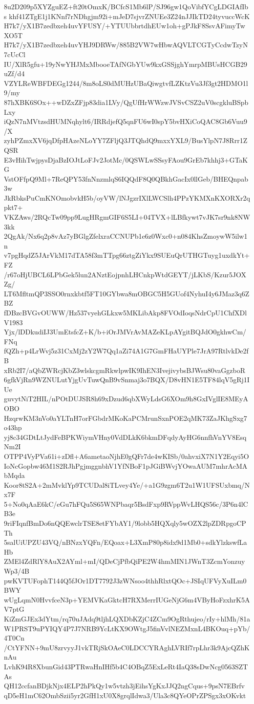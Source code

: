 8u2D209p5XYZguEZ+ft20tOmxK/BCfcS1Mb6lP/SJ96gw1QoVibfYCgLDGIAfIbs
khf41ZTgE1j1KNnf7rNDhgjm92i+mJeD7sjvrZNUEe3Z24nJJIkTD24tyvuccWcK
H7k7/yX1B7zedbxeh4uvYFUSY/+YTUUbbrtdhEUw1oh+gPJkF8SsvAFimyTwXO5T
H7k7/yX1B7zedbxeh4uvYHJ9DRWw/885B2VW7wHbwAQVLTCGTyCcdwTzyN7cUcCl
IU/XlR5gfu+19yNwYHJMxMbooeTAfNGbYUw9kxGSSjghYmrpMBUsHCGB29uZf/d4
VZYLReWBFDEGg1244/8m8oLS0dMUHzUBaQiwgtvfLZKtzVu3Jf3gt2HDMO1l9/my
87hXBK6SOx++wDZxZFjp83dia1LVy/QgUfHrWWzwJVSvCSZ2uV0scgkluBSpbLxy
iQzN7nMVtzsdHUMNqhylt6/IRRdjefQ5qnFU6wI0spY5bvHXiCoQAC8Gb6Vuu9/X
zyhPZmxXV6jqDfpHAzeNLoYY7ZFljQ3JTQhdQ9mxxYXL9/BusYlpN7J8Rrr1ZQSR
E3vHihTwjpysDjaBzIOJtLoFJv2JotMc/0QSWLwSSsyFAou9GrEb7khhj3+GTaKG
VstOFfpQ9Ml+7ReQPY53fnNnzmlqS6IQQdF8Q0QBkhGacIx0llGeb/BHEQnpab3w
JkRbksPuCmKNOmobvkH5b/oyVW/lNJgzrIXlLWCSlh4PPzYKMXnKXORXr2qpkt7+
VKZAws/2RQcTw09pp9LugHRgmGIF6S5LI+04TVX+lLBfkywt7vJK7sr9nk8NW3kk
2QgAk/Nx6q2p8vAz7yBGlgZfelxraCCNUPb1e6z0Wxc0+n084KhsZmoywW5ilw1n
v7pgHqdZ5JArVkM17dTA58f3mTTpg66ztgZiYkx9SUEuQrUTHGTuyg1uxdkYt+FZ
/r67oHjUBCL6LPbGek5lun2ANztEojpnhLHCnkpWtdGEYT/jLKbS/Kzur5JOXZg/
LT6MfltmQP3SSO0rnxkbtf5FT10GYbwa8mOBGC5H5GUof4NyhuI4y6JMaz3q6ZBZ
fDBzcBVGvOUWW/Hz537vyehGLkxw5MKLibAkp8FVOdIoqsNdrCpU1ChfXDlV1983
Yjx/lDDkudiIJ3UmEtsfcZ+K/b+iOrJMVrAvMAZeKLpAYgitBQJdO0gkhwCm/FNq
fQZh+p4LrWvj5z31CxMj2zY2W7Qq1aZi74A1G7GmFHaUYPle7JrA97RtlvkDe2fB
xRb2I7/aQbZWRcjKbZ3wlskcgmRkwlpwIK9IhEN3IvejivybsBJWsu80vaGgzboR
6gfkVjRn9WZNULutYjgUvTuwQnB9vSnmaj3o7BQX/D8vHN1E5TF84lqV5gRj1IUe
guvytNiT2HIL/nPOtDUJSR8h69xDzud6qbXWyLdsG6XOm9h8GxIVglIE8MEyAOBO
HzqrwKM3nVo0aYLTnH7orFGbdrMKoKaPCMrunSxnPOE2qMK73ZaJKhgSxg7o43hp
yj8c34GDtLtJydFeBPKWiymVHny0VdDLkK6bkmDFqdyAyHG6nnfhVnYV8EsqNm2I
OTPP4VyPVa61i+zDfl+A6ametaoNjhE0gQFr7de4wKISb/0ahvxiX7N1Y2Eqyi5O
IoNcGopbw46M1S2RJhPgjmggnbhV1YfNBoF1pJGiBWvjYOwaAUM7mhrAcMAbMqda
Koor8tS2A+2mMvklYp9TCUDal8iTLvey4Ye/+a1G9zgm6T2u1W1UFSUxbmq/Nx7F
5+No0qAaE6kC/eGu7hFQu5S65WNPbaqr5BsdFxp9RVppWvLHQS56c/3P6n4lCB3e
9riFIqnfBmDo6nQQEwclrTSE8etFYbAY1/9lobb5HQXqly5wOZX2lpZDRpgoCPTh
5salUiUPZU43VQ/nBNzxYQFn/EQoax+L3XmP80p8idx9d1Mb0+sdkYlzkswfLaHb
ZMEl4ZdRlY8AuX2AYml+mI/QDeCjPfbQiPE2W4hmMIN1JWnT3ZcmYonzuyWp3/4B
pwKVTUFophT144Q5fJOr1DT7792J3zWNsoo4thhRlxtQOc+JSIqUFVyXuILm0BWY
wUgLqmN0HvvfceN3p+YEMVKaGktcH7RXMerrIUGeNjG6m4VByHoFzxhrK5AV7ptG
KiZmGJEx3dYtm/rq70uJAdq9tljhLQXDbKZjC4ZCm9OgRthujeo/rIy+hlMh/81a
W1PRST9uPYIQY4P7J7NRB9YcLtKX9OWtgJ5finVvlNEZMxnL4BKOuq+pYb/4T0Cn
/CtYFNN+9mU8zrvyyJ1vkTRjSkOAeC0LDCCYRAghLVRIf7rpLhr3k9AjcQZhKnAu
LvhK94R8XbunGid43PTRwaHnIHf5b4C4OBqZ5ExLeRt4IaQ38sDwNcg0563SZTAs
QH12ccfanBDjkNjx4ELP2hPkQy1w5vtzh3jEihsYgKxJJQ2ngCqus+9psN7EBrfv
qD5eH1mC62OmbSzii5yr2GfH1xU0X8grqlIdwa3/Ula3c8QYeOPrZPSgx3xOKvkt
